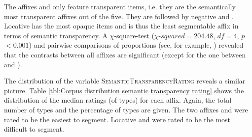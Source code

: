 \begin{table}[h!]
	\caption{Semantic Transparency by affix }
	\label{tbl:Corpus distribution semantic transparency}
	\begin{center}
\vspace*{-0.5cm}
	\end{center}
\end{table}



The affixes  and  only feature transparent items, i.e. they are the semantically most transparent affixes out of the five. They are followed by negative  and . Locative  has the most opaque items and is thus the least segmentable affix in terms of semantic transparency.
 A $\chi$-square-test ($\chi$-$squared=204.48$, $df=4$, $p$ $< 0.001$) and  pairwise comparisons of proportions (see, for example, \citealt[chapter 6.5]{Crawley.2012}) revealed that the contrasts between all affixes are significant (except for the one between  and ).



The distribution of the variable \textsc{SemanticTransparencyRating} reveals a similar picture. Table \ref{tbl:Corpus distribution semantic transparency rating} shows the distribution of the median ratings (of types) for each affix. Again, the total number of types and the percentage of types are given. 
The two affixes  and  were rated to be the easiest to segment. Locative  and  were rated to be the most difficult to segment.
 


